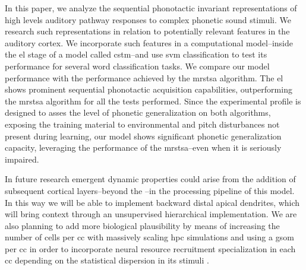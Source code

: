 \documentclass[10pt,letterpaper]{article}
\begin{document}
In this paper, we analyze the sequential phonotactic invariant representations of high levels auditory pathway responses to complex phonetic sound stimuli.  We research such representations in relation to potentially relevant features in the auditory cortex. We incorporate such features in a computational model--inside the \gls{el} stage of a model called \gls{cstm}--and use \gls{svm} classification to test its performance for several word classification tasks. We compare our model performance with the performance achieved by the \gls{mrstsa} algorithm. The \gls{el} shows prominent sequential phonotactic acquisition capabilities, outperforming the \gls{mrstsa} algorithm for all the tests performed. Since the experimental profile is designed to asses the level of phonetic generalization on both algorithms, exposing the training material to environmental and pitch disturbances not present during learning, our model shows significant phonetic generalization capacity, leveraging the performance of the \gls{mrstsa}--even when it is seriously impaired. 


In future research
emergent dynamic properties could arise from the addition of subsequent cortical layers--beyond the --in the processing pipeline of this model.  In this way we will be able to implement backward distal apical dendrites, which will bring context through an unsupervised hierarchical implementation. We are also planning to add more biological plausibility by means of increasing the number of cells per \gls{cc} with massively scaling \gls{hpc} simulations and using a \gls{gsom} per \gls{cc} in order to incorporate neural resource recruitment specialization in each \gls{cc} depending on the statistical dispersion in its stimuli \cite{Meyer19113}.
\end{document}
